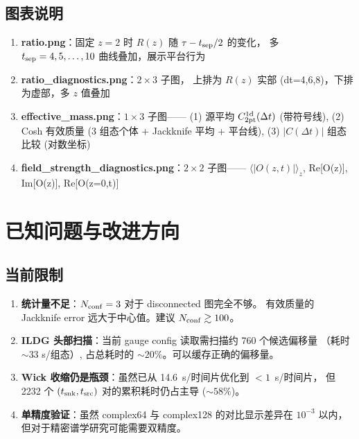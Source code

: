 \documentclass[11pt,a4paper]{article}
\begin{document}
\subsection{图表说明}

\begin{enumerate}[leftmargin=*]
  \item \textbf{ratio.png}：固定 $z=2$ 时 $R(z)$ 随 $\tau - t_{\rm sep}/2$ 的变化，
    多 $t_{\rm sep}=4,5,\ldots,10$ 曲线叠加，展示平台行为
  \item \textbf{ratio\_diagnostics.png}：$2 \times 3$ 子图，
    上排为 $R(z)$ 实部 (dt=4,6,8)，下排为虚部，多 $z$ 值叠加
  \item \textbf{effective\_mass.png}：$1 \times 3$ 子图——
    (1) 源平均 $C_{\rm 2pt}^{\rm 1d}(\Delta t)$ (带符号线),
    (2) Cosh 有效质量 (3 组态个体 + Jackknife 平均 + 平台线),
    (3) $|C(\Delta t)|$ 组态比较 (对数坐标)
  \item \textbf{field\_strength\_diagnostics.png}：$2 \times 2$ 子图——
    $\langle |O(z,t)| \rangle_z$, Re[O(z)], Im[O(z)], Re[O(z=0,t)]
\end{enumerate}

\section{已知问题与改进方向}

\subsection{当前限制}

\begin{enumerate}[leftmargin=*]
  \item \textbf{统计量不足}：$N_{\rm conf}=3$ 对于 disconnected 图完全不够。
    有效质量的 Jackknife error 远大于中心值。建议 $N_{\rm conf} \gtrsim 100$。
  \item \textbf{ILDG 头部扫描}：当前 gauge config 读取需扫描约 760 个候选偏移量
    （耗时 $\sim 33$ s/组态）, 占总耗时的 $\sim 20\%$。可以缓存正确的偏移量。
  \item \textbf{Wick 收缩仍是瓶颈}：虽然已从 14.6~s/时间片优化到 $<1$~s/时间片，
    但 2232 个 $(t_{\rm snk}, t_{\rm src})$ 对的累积耗时仍占主导 ($\sim 58\%$)。
  \item \textbf{单精度验证}：虽然 complex64 与 complex128 的对比显示差异在 $10^{-3}$
    以内，但对于精密谱学研究可能需要双精度。
\end{enumerate}
\end{document}
